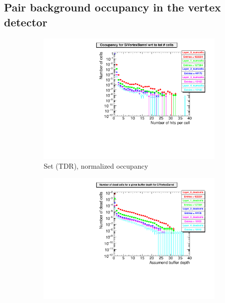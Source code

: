 \subsection{Pair background occupancy in the \sid vertex detector}

\begin{figure}[!h]
 \centering
   \begin{subfigure}[b]{0.49\textwidth}
   \centering
    \includegraphics[width=\textwidth]{Figures/Pairs/Appendix/occupancy_numcells_SiVertexBarrel_ILC250_TDR.pdf}
   \caption{Set (TDR), normalized occupancy}
   \end{subfigure}
   \hfill
    \begin{subfigure}[b]{0.49\textwidth}
   \centering
    \includegraphics[width=\textwidth]{Figures/Pairs/Appendix/occupancy_deadcells_SiVertexBarrel_ILC250_TDR.pdf}

\end{subfigure}
\end{figure}
